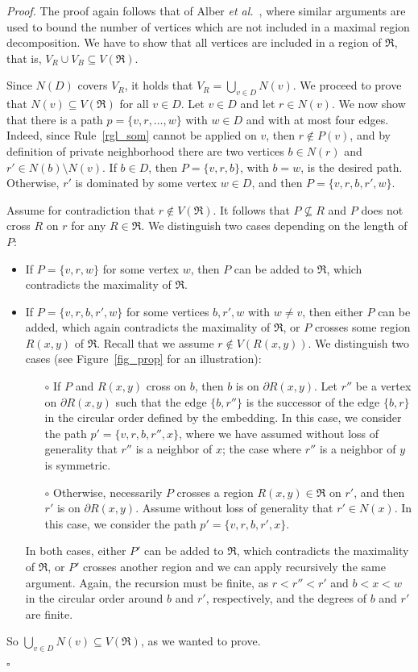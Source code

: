 \documentclass[a4paper,11pt]{article}
\newcommand{\rrgl}   [1] {Rule~\ref{#1}\xspace}
\newenvironment{proof}{\noindent \textit{Proof. }}{\hfill$\square$\vspace{.2cm}}
\begin{document}
\begin{proof} The proof again follows that of Alber \emph{et al.}~\cite[Lemma 6 and Proposition 2]{AFN04}, where similar arguments are used to bound the number of vertices which are not included in a maximal region decomposition. We have to show that all vertices are included in a region of $\Re$, that is, $V_R \cup V_B \subseteq V(\Re)$.

Since $N(D)$ covers $V_R$, it holds that $V_R = \bigcup_{v \in D} N(v)$. We proceed to prove that $N(v) \subseteq V(\Re)$ for all $v \in D$. Let $v\in D$ and let $ r \in N(v)$. We now show that there is a path $p=\{v,r,\dots,w\}$ with $w \in D$ and with at most four edges. Indeed, since \rrgl{rgl_som} cannot be applied on $v$, then $r \notin P(v)$, and by definition of private neighborhood there are two vertices $b \in N(r)$ and $r' \in  N(b) \setminus N(v)$. If $b \in D$, then $P = \{v,r,b\}$, with $b = w$,  is the desired path. Otherwise, $r'$ is dominated by some vertex $w\in D$, and then $P = \{v,r,b,r',w\}$.

Assume for contradiction that $r \notin V(\Re)$. It follows that $P \nsubseteq R $ and $P$ does not cross $R$ on $r$ for any $R \in \Re$. We distinguish two cases depending on the length of $P$:

\begin{itemize}\itemsep0em
\item If $P=\{v,r,w\}$ for some vertex $w$, then $P$ can be added to $\Re$, which contradicts the maximality of $\Re$.
\item If $P=\{v,r,b,r',w\}$ for some vertices $b,r',w$ with $w \neq v$, then either $P$ can be added, which again contradicts the maximality of $\Re$, or $P$ crosses some region $R(x,y)$ of $\Re$. Recall that we assume $r \notin V(R(x,y))$. We distinguish two cases (see Figure~\ref{fig_prop} for an illustration):
\begin{itemize}\itemsep0em

\item[$\circ$] If $P$ and $R(x,y)$ cross on $b$, then $b$ is on $\partial R(x,y)$. Let $r''$ be a vertex on $\partial R(x,y)$ such that the edge $\{b,r''\}$ is the successor of the edge $\{b,r\}$ in the circular order defined by the embedding. In this case, we consider the path $p' =\{v,r,b,r'',x\}$, where we have assumed without loss of generality that $r''$ is a neighbor  of $x$; the case where $r''$ is a neighbor  of $y$ is symmetric.
\item[$\circ$] Otherwise, necessarily $P$ crosses a region $R(x,y) \in \Re$ on $r'$, and then $r'$ is on $\partial R(x,y)$. Assume without loss of generality that $r' \in N(x)$. In this case, we consider the path $p'=\{v,r,b,r',x\}$.
\end{itemize}
In both cases, either $P'$ can be added to $\Re$, which contradicts the maximality of $\Re$, or $P'$ crosses another region and we can apply recursively the same argument. Again, the recursion must be finite, as $r<r''<r'$ and $b<x<w$ in the circular order around $b$ and $r'$, respectively, and the degrees of $b$ and $r'$ are finite.
\end{itemize}
So $\bigcup_{v \in D} N(v) \subseteq V(\Re)$, as we wanted to prove.


\end{proof}
\end{document}
